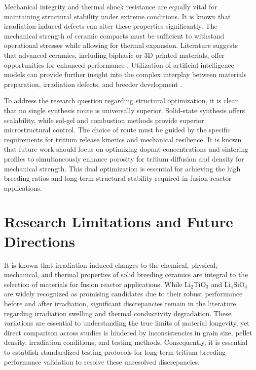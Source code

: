 \documentclass[review,12pt,a4paper]{elsarticle}
\begin{document}
\textcolor{medconf}{Mechanical integrity and thermal shock resistance are equally vital for maintaining structural stability under extreme conditions. It is known that irradiation-induced defects can alter these properties significantly. The mechanical strength of ceramic compacts must be sufficient to withstand operational stresses while allowing for thermal expansion. Literature suggests that advanced ceramics, including biphasic or 3D printed materials, offer opportunities for enhanced performance \citep{wu_experiment_2024}. Utilization of artificial intelligence models can provide further insight into the complex interplay between materials preparation, irradiation defects, and breeder development \citep{wu_experiment_2024}.}

\textcolor{medconf}{To address the research question regarding structural optimization, it is clear that no single synthesis route is universally superior. Solid-state synthesis offers scalability, while sol-gel and combustion methods provide superior microstructural control. The choice of route must be guided by the specific requirements for tritium release kinetics and mechanical resilience. It is known that future work should focus on optimizing dopant concentrations and sintering profiles to simultaneously enhance porosity for tritium diffusion and density for mechanical strength. This dual optimization is essential for achieving the high breeding ratios and long-term structural stability required in fusion reactor applications.}

\section*{Research Limitations and Future Directions}


\textcolor{highconf}{It is known that irradiation-induced changes to the chemical, physical, mechanical, and thermal properties of solid breeding ceramics are integral to the selection of materials for fusion reactor applications. While $\mathrm{Li}_2\mathrm{TiO}_3$ and $\mathrm{Li}_4\mathrm{SiO}_4$ are widely recognized as promising candidates due to their robust performance before and after irradiation, significant discrepancies remain in the literature regarding irradiation swelling and thermal conductivity degradation. These variations are essential to understanding the true limits of material longevity, yet direct comparison across studies is hindered by inconsistencies in grain size, pellet density, irradiation conditions, and testing methods. Consequently, it is essential to establish standardized testing protocols for long-term tritium breeding performance validation to resolve these unresolved discrepancies.}
\end{document}
